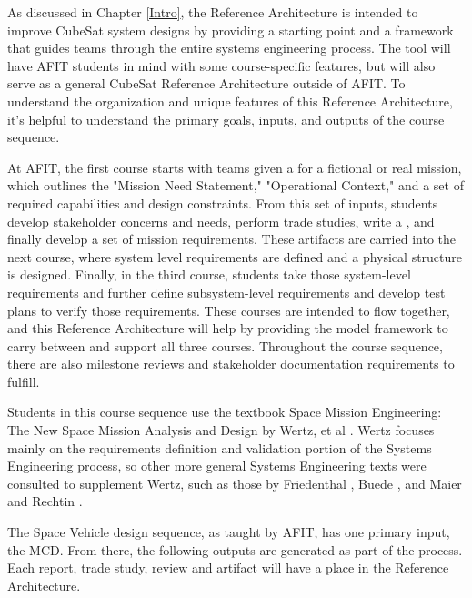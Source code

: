 As discussed in Chapter \ref{Intro}, the Reference Architecture is intended to improve CubeSat system designs by providing a starting point and a framework that guides teams through the entire systems engineering process. The tool will have AFIT students in mind with some course-specific features, but will also serve as a general CubeSat Reference Architecture outside of AFIT. To understand the organization and unique features of this Reference Architecture, it's helpful to understand the primary goals, inputs, and outputs of the course sequence. 

At AFIT, the first course starts with teams given a  for a fictional or real mission, which outlines the "Mission Need Statement," "Operational Context," and a set of required capabilities and design constraints. From this set of inputs, students develop stakeholder concerns and needs, perform trade studies, write a , and finally develop a set of mission requirements. These artifacts are carried into the next course, where system level requirements are defined and a physical structure is designed. Finally, in the third course, students take those system-level requirements and further define subsystem-level requirements and develop test plans to verify those requirements. These courses are intended to flow together, and this Reference Architecture will help by providing the model framework to carry between and support all three courses. Throughout the course sequence, there are also milestone reviews and stakeholder documentation requirements to fulfill. 

Students in this course sequence use the textbook Space Mission Engineering: The New Space Mission Analysis and Design by Wertz, et al \citep{Wertz2011SpaceSMAD}. Wertz focuses mainly on the requirements definition and validation portion of the Systems Engineering process, so other more general Systems Engineering texts were consulted to supplement Wertz, such as those by Friedenthal \citep{FriedenthalPracticalGuide}, Buede \citep{Buede2016}, and Maier and Rechtin \citep{MaierRechtin}. 


The Space Vehicle design sequence, as taught by AFIT, has one primary input, the MCD. From there, the following outputs are generated as part of the process. Each report, trade study, review and artifact will have a place in the Reference Architecture.

